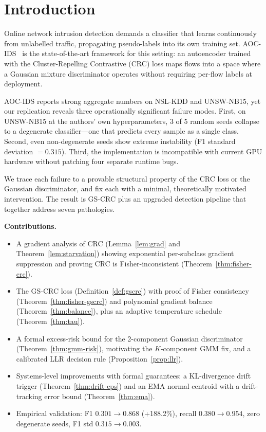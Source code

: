 \documentclass[conference]{IEEEtran}
\begin{document}
\section{Introduction}

Online network intrusion detection demands a classifier that learns
continuously from unlabelled traffic, propagating pseudo-labels into its own
training set. AOC-IDS~\cite{zhang2024aoc} is the state-of-the-art
framework for this setting: an autoencoder trained with the Cluster-Repelling
Contrastive (CRC) loss maps flows into a space where a Gaussian mixture
discriminator operates without requiring per-flow labels at deployment.

AOC-IDS reports strong aggregate numbers on NSL-KDD and UNSW-NB15,
yet our replication reveals three operationally significant failure modes.
First, on UNSW-NB15 at the authors' own hyperparameters, 3 of 5
random seeds collapse to a degenerate classifier---one that predicts
every sample as a single class. Second, even non-degenerate seeds
show extreme instability (F1 standard deviation $= 0.315$). Third,
the implementation is incompatible with current GPU hardware without
patching four separate runtime bugs.

We trace each failure to a provable structural property of the CRC loss
or the Gaussian discriminator, and fix each with a minimal,
theoretically motivated intervention. The result is GS-CRC plus an
upgraded detection pipeline that together address seven pathologies.

\medskip
\noindent\textbf{Contributions.}
\begin{itemize}
\item A gradient analysis of CRC (Lemma~\ref{lem:grad}
      and Theorem~\ref{lem:starvation}) showing exponential per-subclass
      gradient suppression and proving CRC is Fisher-inconsistent
      (Theorem~\ref{thm:fisher-crc}).
\item The GS-CRC loss (Definition~\ref{def:gscrc}) with proof of Fisher
      consistency (Theorem~\ref{thm:fisher-gscrc}) and polynomial gradient
      balance (Theorem~\ref{thm:balance}), plus an adaptive temperature
      schedule (Theorem~\ref{thm:tau}).
\item A formal excess-risk bound for the 2-component Gaussian discriminator
      (Theorem~\ref{thm:gmm-risk}), motivating the $K$-component GMM fix,
      and a calibrated LLR decision rule (Proposition~\ref{prop:llr}).
\item Systems-level improvements with formal guarantees: a KL-divergence
      drift trigger (Theorem~\ref{thm:drift-eps}) and an EMA normal centroid
      with a drift-tracking error bound (Theorem~\ref{thm:ema}).
\item Empirical validation: F1 $0.301 \to 0.868$ (+188.2\%), recall
      $0.380 \to 0.954$, zero degenerate seeds, F1 std $0.315 \to 0.003$.
\end{itemize}
\end{document}
